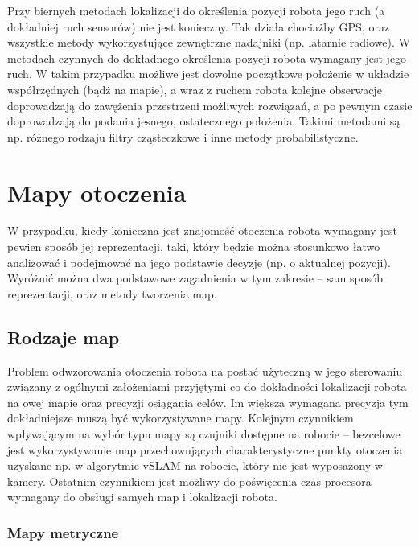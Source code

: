Przy biernych metodach lokalizacji do określenia pozycji robota jego ruch
(a dokładniej ruch sensorów) nie jest konieczny. Tak działa chociażby GPS, oraz
wszystkie metody wykorzystujące zewnętrzne nadajniki (np. latarnie radiowe). W
metodach czynnych do dokładnego określenia pozycji robota wymagany jest jego
ruch. W takim przypadku możliwe jest dowolne początkowe położenie w układzie
współrzędnych (bądź na mapie), a wraz z ruchem robota kolejne obserwacje
doprowadzają do zawężenia przestrzeni możliwych rozwiązań, a po pewnym czasie
doprowadzają do podania jesnego, ostatecznego położenia. Takimi metodami są np.
różnego rodzaju filtry cząsteczkowe i inne metody probabilistyczne.

\section{Mapy otoczenia}

W przypadku, kiedy konieczna jest znajomość otoczenia robota wymagany jest pewien
sposób jej reprezentacji, taki, który będzie można stosunkowo łatwo analizować
i podejmować na jego podstawie decyzje (np. o aktualnej pozycji). Wyróżnić
można dwa podstawowe zagadnienia w tym zakresie -- sam sposób reprezentacji,
oraz metody tworzenia map.

\subsection{Rodzaje map}

Problem odwzorowania otoczenia robota na postać użyteczną w jego sterowaniu
związany z ogólnymi założeniami przyjętymi co do dokładności lokalizacji robota
na owej mapie oraz precyzji osiągania celów. Im większa wymagana precyzja
tym dokładniejsze muszą być wykorzystywane mapy. Kolejnym czynnikiem wpływającym
na wybór typu mapy są czujniki dostępne na robocie -- bezcelowe jest wykorzystywanie
map przechowujących charakterystyczne punkty otoczenia uzyskane np. w algorytmie
vSLAM na robocie, który nie jest wyposażony w kamery. Ostatnim czynnikiem
jest możliwy do poświęcenia czas procesora wymagany do obsługi samych map
i lokalizacji robota.

\subsubsection{Mapy metryczne}

